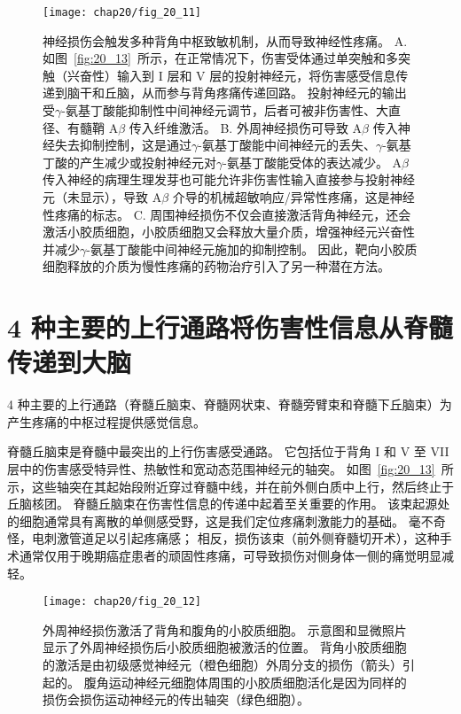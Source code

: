 \begin{figure}[htbp]
	\centering
	\texttt{[image: chap20/fig\_20\_11]}
	\caption{神经损伤会触发多种背角中枢致敏机制，从而导致神经性疼痛。
		A. 如图~\ref{fig:20_13}~所示，在正常情况下，伤害受体通过单突触和多突触（兴奋性）输入到 I 层和 V 层的投射神经元，将伤害感受信息传递到脑干和丘脑，从而参与背角疼痛传递回路。
		投射神经元的输出受$\gamma$-氨基丁酸能抑制性中间神经元调节，后者可被非伤害性、大直径、有髓鞘 A$ \beta $ 传入纤维激活。
		B. 外周神经损伤可导致 A$ \beta $ 传入神经失去抑制控制，这是通过$\gamma$-氨基丁酸能中间神经元的丢失、$\gamma$-氨基丁酸的产生减少或投射神经元对$\gamma$-氨基丁酸能受体的表达减少。
		A$ \beta $ 传入神经的病理生理发芽也可能允许非伤害性输入直接参与投射神经元（未显示），导致 A$ \beta $ 介导的机械超敏响应/异常性疼痛，这是神经性疼痛的标志。
		C. 周围神经损伤不仅会直接激活背角神经元，还会激活小胶质细胞，小胶质细胞又会释放大量介质，增强神经元兴奋性并减少$\gamma$-氨基丁酸能中间神经元施加的抑制控制。
		因此，靶向小胶质细胞释放的介质为慢性疼痛的药物治疗引入了另一种潜在方法。}
	\label{fig:20_11}
\end{figure}



\section{4 种主要的上行通路将伤害性信息从脊髓传递到大脑}

4 种主要的上行通路（脊髓丘脑束、脊髓网状束、脊髓旁臂束和脊髓下丘脑束）为产生疼痛的中枢过程提供感觉信息。


脊髓丘脑束是脊髓中最突出的上行伤害感受通路。
它包括位于背角 I 和 V 至 VII 层中的伤害感受特异性、热敏性和宽动态范围神经元的轴突。
如图~\ref{fig:20_13}~所示，这些轴突在其起始段附近穿过脊髓中线，并在前外侧白质中上行，然后终止于丘脑核团。
脊髓丘脑束在伤害性信息的传递中起着至关重要的作用。 
该束起源处的细胞通常具有离散的单侧感受野，这是我们定位疼痛刺激能力的基础。
毫不奇怪，电刺激管道足以引起疼痛感；
相反，损伤该束（前外侧脊髓切开术），这种手术通常仅用于晚期癌症患者的顽固性疼痛，可导致损伤对侧身体一侧的痛觉明显减轻。


\begin{figure}[htbp]
	\centering
	\texttt{[image: chap20/fig\_20\_12]}
	\caption{外周神经损伤激活了背角和腹角的小胶质细胞。
		示意图和显微照片显示了外周神经损伤后小胶质细胞被激活的位置。
		背角小胶质细胞的激活是由初级感觉神经元（橙色细胞）外周分支的损伤（箭头）引起的。
		腹角运动神经元细胞体周围的小胶质细胞活化是因为同样的损伤会损伤运动神经元的传出轴突（绿色细胞）。}
	\label{fig:20_12}
\end{figure}


